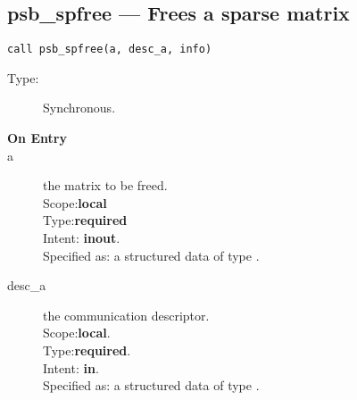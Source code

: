 




%
%
\clearpage\subsection*{psb\_spfree --- Frees a sparse matrix}

\begin{verbatim}
call psb_spfree(a, desc_a, info)
\end{verbatim}

\begin{description}
\item[Type:] Synchronous.
\item[\bf On Entry]
\item[a] the matrix to be freed.\\
Scope:{\bf local}\\
Type:{\bf required}\\
Intent: {\bf inout}.\\
Specified as: a structured data of type \spdata.
\item[desc\_a] the communication descriptor.\\
Scope:{\bf local}.\\
Type:{\bf required}.\\
Intent: {\bf in}.\\
Specified as: a structured data of type \descdata.
\end{description}

